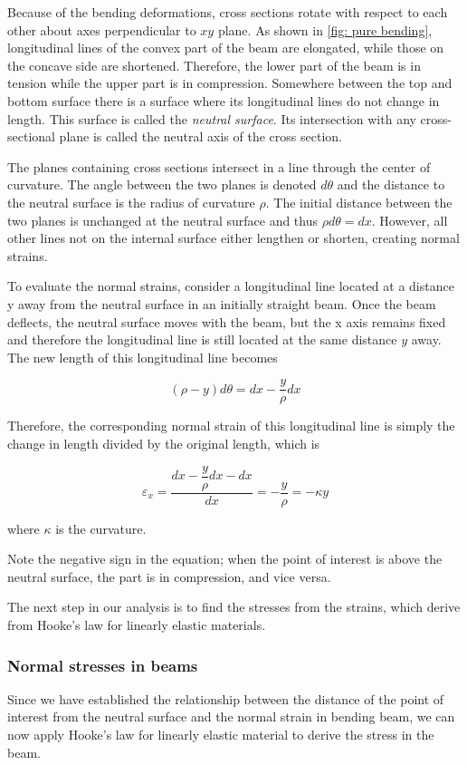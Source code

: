 \documentclass[a4paper,openany,nobib]{tufte-book}
\begin{document}
Because of the bending deformations, cross sections rotate with respect
to each other about axes perpendicular to \(xy\) plane. As shown in \ref{fig: pure bending}, longitudinal lines of the
convex part of the beam are elongated, while those on the concave side
are shortened. Therefore, the lower part of the beam is in tension while
the upper part is in compression. Somewhere between the top and bottom
surface there is a surface where its longitudinal lines do not change in
length. This surface is called the \emph{neutral surface}. Its intersection
with any cross-sectional plane is called the neutral axis of the cross
section.

The planes containing cross sections intersect in a line through the
center of curvature. The angle between the two planes is denoted
\(d\theta\) and the distance to the neutral surface is the radius of
curvature \(\rho\). The initial distance between the two planes is
unchanged at the neutral surface and thus \(\rho d \theta = dx\). However,
all other lines not on the internal surface either lengthen or shorten,
creating normal strains.

To evaluate the normal strains, consider a longitudinal line located at
a distance y away from the neutral surface in an initially straight
beam. Once the beam deflects, the neutral surface moves with the beam,
but the x axis remains fixed and therefore the longitudinal line is
still located at the same distance \(y\) away. The new length of this
longitudinal line becomes

$$(\rho  - y)d\theta  = dx - \dfrac{y}{\rho }dx$$

Therefore, the corresponding normal strain of this longitudinal line is
simply the change in length divided by the original length, which is

$$\varepsilon _x = \frac{dx - \dfrac{y}{\rho }dx - dx}{dx} =  - \dfrac{y}{\rho } =  - \kappa y$$

where \(\kappa\) is the curvature.

Note the negative sign in the equation; when the point of interest is
above the neutral surface, the part is in compression, and vice versa.

The next step in our analysis is to find the stresses from the strains,
which derive from Hooke's law for linearly elastic materials.

\subsubsection{Normal stresses in beams}
\label{normal-stresses-in-beams}
Since we have established the relationship between the distance of the
point of interest from the neutral surface and the normal strain in
bending beam, we can now apply Hooke's law for linearly elastic material
to derive the stress in the beam.
\end{document}
